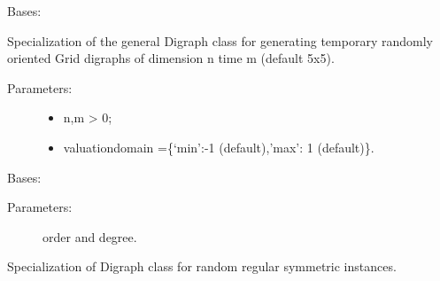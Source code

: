 \documentclass[letterpaper,10pt,english]{sphinxmanual}
\begin{document}
\begin{fulllineitems}
\label{techDoc:randomDigraphs.RandomGridDigraph}
Bases: {\hyperref[techDoc:digraphs.GridDigraph]{\emph{}}}

Specialization of the general Digraph class for generating
temporary randomly oriented Grid digraphs of dimension n time m
(default 5x5).
\begin{description}
\item[{Parameters:}] \leavevmode\begin{itemize}
\item {} 
n,m \textgreater{} 0;

\item {} 
valuationdomain =\{`min':-1 (default),'max': 1 (default)\}.

\end{itemize}

\end{description}

\end{fulllineitems}


\begin{fulllineitems}
\label{techDoc:randomDigraphs.RandomRegularDigraph}
Bases: {\hyperref[techDoc:digraphs.Digraph]{\emph{}}}
\begin{description}
\item[{Parameters:}] \leavevmode
order and degree.

\end{description}

Specialization of Digraph class for random regular symmetric instances.

\end{fulllineitems}

\end{document}
